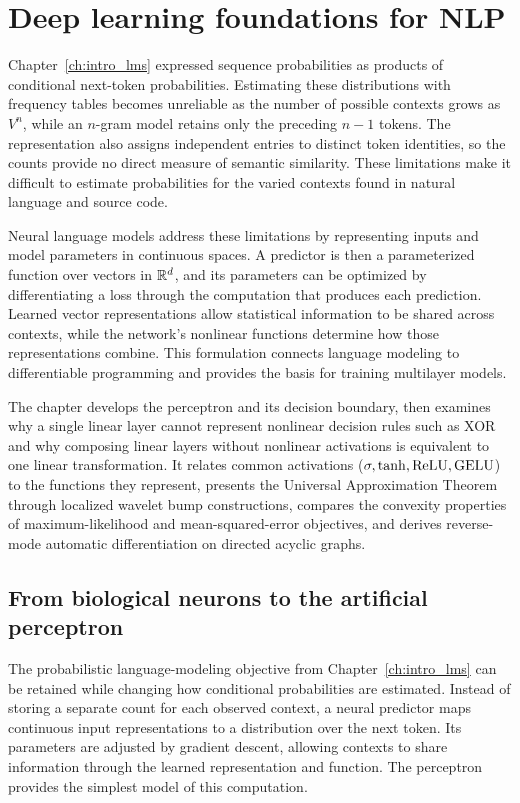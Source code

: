 \documentclass[../../main.tex]{subfiles}
\begin{document}
\chapter{Deep learning foundations for NLP}
\label{ch:deep_learning_foundations}

Chapter~\ref{ch:intro_lms} expressed sequence probabilities as products of conditional next-token probabilities. Estimating these distributions with frequency tables becomes unreliable as the number of possible contexts grows as $V^n$, while an $n$-gram model retains only the preceding $n-1$ tokens. The representation also assigns independent entries to distinct token identities, so the counts provide no direct measure of semantic similarity. These limitations make it difficult to estimate probabilities for the varied contexts found in natural language and source code.

Neural language models address these limitations by representing inputs and model parameters in continuous spaces. A predictor is then a parameterized function over vectors in $\mathbb{R}^d$, and its parameters can be optimized by differentiating a loss through the computation that produces each prediction. Learned vector representations allow statistical information to be shared across contexts, while the network's nonlinear functions determine how those representations combine. This formulation connects language modeling to differentiable programming and provides the basis for training multilayer models.

The chapter develops the perceptron and its decision boundary, then examines why a single linear layer cannot represent nonlinear decision rules such as XOR and why composing linear layers without nonlinear activations is equivalent to one linear transformation. It relates common activations ($\sigma, \tanh, \operatorname{\mathrm{ReLU}}, \operatorname{\mathrm{GELU}}$) to the functions they represent, presents the Universal Approximation Theorem through localized wavelet bump constructions, compares the convexity properties of maximum-likelihood and mean-squared-error objectives, and derives reverse-mode automatic differentiation on directed acyclic graphs.

\clearpage
\section{From biological neurons to the artificial perceptron}
\label{sec:perceptron}

The probabilistic language-modeling objective from Chapter~\ref{ch:intro_lms} can be retained while changing how conditional probabilities are estimated. Instead of storing a separate count for each observed context, a neural predictor maps continuous input representations to a distribution over the next token. Its parameters are adjusted by gradient descent, allowing contexts to share information through the learned representation and function. The perceptron provides the simplest model of this computation.
\end{document}
